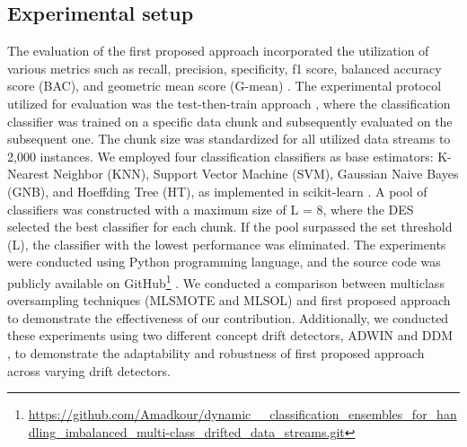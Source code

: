 \subsection{Experimental setup}
The evaluation of the first proposed approach incorporated the utilization of various metrics such as recall, precision, specificity, f1 score, balanced accuracy score (BAC), and geometric mean score (G-mean) \cite{bu2016pdf}. The experimental protocol utilized for evaluation was the test-then-train approach \cite{venkatasubramanianinformation}, where the classification classifier was trained on a specific data chunk and subsequently evaluated on the subsequent one. The chunk size was standardized for all utilized data streams to 2,000 instances. We employed four classification classifiers as base estimators: K-Nearest Neighbor (KNN), Support Vector Machine (SVM), Gaussian Naive Bayes (GNB), and Hoeffding Tree (HT), as implemented in scikit-learn \cite{frias2014online}. A pool of classifiers was constructed with a maximum size of L = 8, where the DES selected the best classifier for each chunk. If the pool surpassed the set threshold (L), the classifier with the lowest performance was eliminated. The experiments were conducted using Python programming language, and the source code was publicly available on GitHub\footnote{\url{https://github.com/Amadkour/dynamic__classification_ensembles_for_handling_imbalanced_multi-class_drifted_data_streams.git}} . We conducted a comparison between multiclass oversampling techniques (MLSMOTE and MLSOL) and first proposed approach to demonstrate the effectiveness of our contribution. Additionally, we conducted these experiments using two different concept drift detectors, ADWIN \cite{storkey2008training} and DDM \cite{losing2016knn}, to demonstrate the adaptability and robustness of first proposed approach across varying drift detectors.

